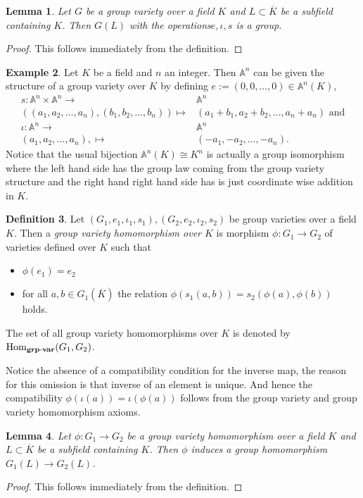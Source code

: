 \documentclass[a4paper,12pt,reqno]{amsart}
\newcommand{\field}[1]{\mathbb{#1}}  %
\newcommand{\A}{\field{A}}
\newcommand{\HomGrpVar}{\mathrm{Hom}_{\bf grp\text{-}var}}
\newtheorem{lemma}{Lemma}
\theoremstyle{definition}
\newtheorem{definition}[lemma]{Definition}
\newtheorem{example}[lemma]{Example}
\numberwithin{lemma}{section}
\numberwithin{equation}{section}
\numberwithin{figure}{section}
\begin{document}
\begin{lemma}\label{stmt:group-structure-on-group-variety}
	Let $G$ be a group variety over a field $K$ and $L\subset \overline K$ be a subfield containing $K$. Then $G(L)$ with the operations$e,\iota, s$ is a group.
\end{lemma}
\begin{proof}
	This follows immediately from the definition.
\end{proof}

\begin{example}
Let $K$ be a field and $n$ an integer. Then $\A^n$ can be given the structure of a group variety over $K$ by defining $e:=(0,0,\ldots,0) \in \A^n(K)$, 
\begin{align}
s \colon  \A^n \times \A^n \to& \A^n \\
((a_1,a_2,\ldots, a_n),(b_1,b_2,\ldots, b_n)) \mapsto& (a_1+b_1,a_2+b_2,\ldots, a_n+a_n) \text{ and} \\
\iota \colon  \A^n  \to& \A^n \\
(a_1,a_2,\ldots, a_n), \mapsto& (-a_1,-a_2,\ldots, -a_n).
\end{align}
Notice that the usual bijection $\A^n(K) \cong K^n$ is actually a group isomorphism where the left hand side has the group law coming from the group variety structure and the right hand right hand side has is just coordinate wise addition in $K$.
\end{example}

\begin{definition}\label{def:group-variety-homomorphism}
Let $(G_1,e_1,\iota_1,s_1), (G_2,e_2,\iota_2,s_2)$ be group varieties over  a field $K$. Then a \textit{group variety homomorphism over $K$} is morphism $\phi: G_1 \to G_2$ of varieties defined over $K$ such that
\begin{itemize}
	\item $\phi(e_1)=e_2$
	\item for all $a,b \in G_1(\overline K)$ the relation $\phi(s_1(a,b)) = s_2(\phi(a),\phi(b))$ holds.
\end{itemize}
The set of all group variety homomorphisms over $K$ is denoted by $\HomGrpVar(G_1,G_2)$.
\end{definition}
Notice the absence of a compatibility condition for the inverse map, the reason for this omission is that inverse of an element is unique. And hence the compatibility $\phi(\iota(a))=\iota(\phi(a))$ follows from the group variety and group variety homomorphism axioms.

\begin{lemma}\label{stmt:group-homomorphism-from-group-variety-homomorphism}
	Let $\phi: G_1 \to G_2$ be a group variety homomorphism over a field $K$ and $L\subset \overline K$ be a subfield containing $K$. Then $\phi$ induces a group homomorphism  $G_1(L) \to G_2(L)$.
\end{lemma}
\begin{proof}
	This follows immediately from the definition.
\end{proof}
\end{document}
